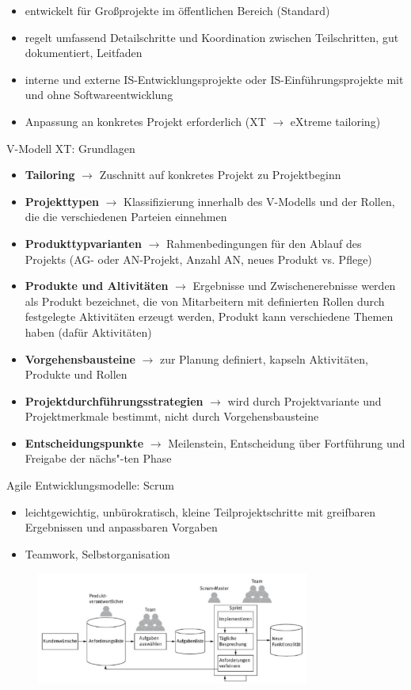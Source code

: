 \begin{itemize}
  \item entwickelt für Großprojekte im öffentlichen Bereich (Standard)
  \item regelt umfassend Detailschritte und Koordination zwischen Teilschritten, gut dokumentiert, Leitfaden
  \item interne und externe IS-Entwicklungsprojekte oder IS-Einführungsprojekte mit und ohne Softwareentwicklung
  \item Anpassung an konkretes Projekt erforderlich (XT $\rightarrow$ eXtreme tailoring)
\end{itemize}

V-Modell XT: Grundlagen

\begin{itemize}
  \item \textbf{Tailoring} $\rightarrow$ Zuschnitt auf konkretes Projekt zu Projektbeginn
  \item \textbf{Projekttypen} $\rightarrow$ Klassifizierung innerhalb des V-Modells und der Rollen, die die verschiedenen Parteien einnehmen
  \item \textbf{Produkttypvarianten} $\rightarrow$ Rahmenbedingungen für den Ablauf des Projekts (AG- oder AN-Projekt, Anzahl AN, neues Produkt vs. Pflege)
  \item \textbf{Produkte und Altivitäten} $\rightarrow$ Ergebnisse und Zwischenerebnisse werden als Produkt bezeichnet, die von Mitarbeitern mit definierten Rollen durch festgelegte Aktivitäten erzeugt werden, Produkt kann verschiedene Themen haben (dafür Aktivitäten)
  \item \textbf{Vorgehensbausteine} $\rightarrow$ zur Planung definiert, kapseln Aktivitäten, Produkte und Rollen
  \item \textbf{Projektdurchführungsstrategien} $\rightarrow$ wird durch Projektvariante und Projektmerkmale bestimmt, nicht durch Vorgehensbausteine
  \item \textbf{Entscheidungspunkte} $\rightarrow$ Meilenstein, Entscheidung über Fortführung und Freigabe der nächs"-ten Phase
\end{itemize}

\clearpage
Agile Entwicklungsmodelle: Scrum

\begin{itemize}
  \item leichtgewichtig, unbürokratisch, kleine Teilprojektschritte mit greifbaren Ergebnissen und anpassbaren Vorgaben
  \item Teamwork, Selbstorganisation
\end{itemize}

\begin{figure}[h]
\centering
\includegraphics[width=0.8\textwidth]{assets/Scrum.png}
\end{figure}
